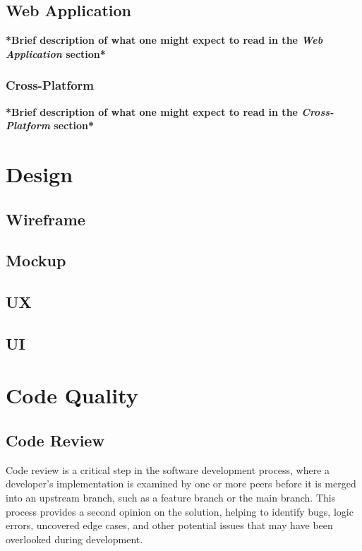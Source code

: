 \subsection{Web Application}

\textbf{*Brief description of what one might expect to read in the \textit{Web Application} section*}

\subsubsection*{Cross-Platform}

\textbf{*Brief description of what one might expect to read in the \textit{Cross-Platform} section*}

\section{Design}

\subsection{Wireframe}

\subsection{Mockup}

\subsection{UX}

\subsection{UI}

\section{Code Quality}

\subsection{Code Review}

Code review is a critical step in the software development process, where a developer's implementation is examined by one or more peers before it is merged into an upstream branch, such as a feature branch or the main branch. This process provides a second opinion on the solution, helping to identify bugs, logic errors, uncovered edge cases, and other potential issues that may have been overlooked during development. \cite{gitlab:code-review} \\

